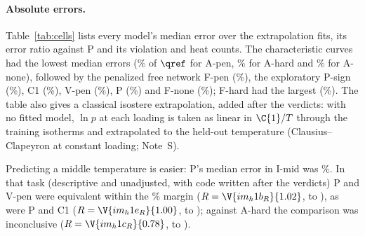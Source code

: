\documentclass[journal=jcisd8,manuscript=article]{achemso}
\begin{document}
\paragraph{Absolute errors.} Table~\ref{tab:cells} lists every model's median error over the 
extrapolation fits, its error ratio against P and its violation and heat counts. The characteristic curves had the
lowest median errors (\% of $\qref$ for A-pen, \% for A-hard and
\% for A-none), followed by the penalized free network F-pen (\%), the exploratory
P-sign (\%), C1 (\%), V-pen (\%), P (\%) and
F-none (\%); F-hard had the largest (\%). The table also gives a
classical isostere extrapolation, added after the verdicts: with no fitted model, $\ln p$ at each loading is taken
as linear in $\C{1}/T$ through the training isotherms and extrapolated to the held-out temperature (Clausius--Clapeyron
at constant loading; Note~S).

\begin{table}[t]
\caption{Every model over the extrapolation fits (E-high and E-low,  per model; descriptive).}
\label{tab:cells}

\par{}
\end{table}

Predicting a middle temperature is easier: P's
median error in I-mid was \%. In that task (descriptive and unadjusted, with code written after the
verdicts) P and V-pen were equivalent within the \% margin ($R = \V{im_h1b_R}{1.02}$,
 to ), as were P and C1 ($R = \V{im_h1e_R}{1.00}$,  to
); against A-hard the comparison was inconclusive ($R = \V{im_h1c_R}{0.78}$, 
to ).
\end{document}
